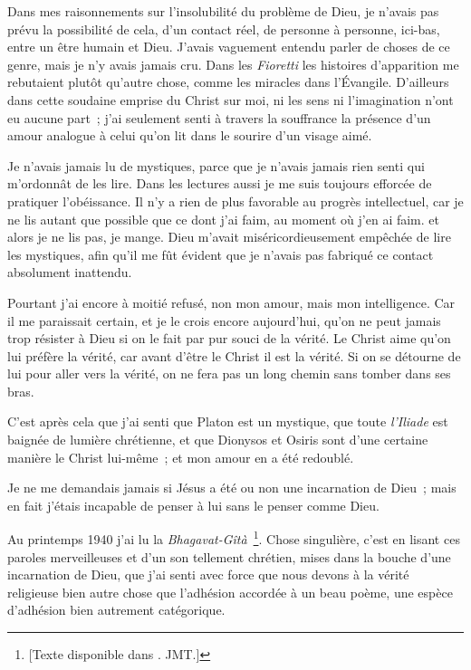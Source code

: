 \documentclass[french,twoside]{book} %
\begin{document}
Dans mes raisonnements sur l'insolubilité du problème de Dieu, je n'avais pas prévu la possibilité de cela, d'un contact réel, de personne à personne, ici-bas, entre un être humain et Dieu. J'avais vaguement entendu parler de choses de ce genre, mais je n'y avais jamais cru. Dans les {\itshape Fioretti} les histoires d'apparition me rebutaient plutôt qu'autre chose, comme les miracles dans l'Évangile. D'ailleurs dans cette soudaine emprise du Christ sur moi, ni les sens ni l'imagination n'ont eu aucune part ; j'ai seulement senti à travers la souffrance la présence d'un amour analogue à celui qu'on lit dans le sourire d'un visage aimé.\par
Je n'avais jamais lu de mystiques, parce que je n'avais jamais rien senti qui m'ordonnât de les lire. Dans les lectures aussi je me suis toujours efforcée de pratiquer l'obéissance. Il n'y a rien de plus favorable au progrès intellectuel, car je ne lis autant que possible que ce dont j'ai faim, au moment où j'en ai faim. et alors je ne lis pas, je mange. Dieu m'avait miséricordieusement empêchée de lire les mystiques, afin qu'il me fût évident que je n'avais pas fabriqué ce contact absolument inattendu.\par
Pourtant j'ai encore à moitié refusé, non mon amour, mais mon intelligence. Car il me paraissait certain, et je le crois encore aujourd'hui, qu'on ne peut jamais trop résister à Dieu si on le fait par pur souci de la vérité. Le Christ aime qu'on lui préfère la vérité, car avant d'être le Christ il est la vérité. Si on se détourne de lui pour aller vers la vérité, on ne fera pas un long chemin sans tomber dans ses bras.\par
C'est après cela que j'ai senti que Platon est un mystique, que toute {\itshape l'Iliade} est baignée de lumière chrétienne, et que Dionysos et Osiris sont d'une certaine manière le Christ lui-même ; et mon amour en a été redoublé.\par
Je ne me demandais jamais si Jésus a été ou non une incarnation de Dieu ; mais en fait j'étais incapable de penser à lui sans le penser comme Dieu.\par
Au printemps 1940 j'ai lu la {\itshape Bhagavat-Gîtà} \footnote{ [Texte disponible dans \href{http://dx.doi.org/doi:10.1522/24900867}{}. JMT.]}. Chose singulière, c'est en lisant ces paroles merveilleuses et d'un son tellement chrétien, mises dans la bouche d'une incarnation de Dieu, que j'ai senti avec force que nous devons à la vérité religieuse bien autre chose que l'adhésion accordée à un beau poème, une espèce d'adhésion bien autrement catégorique.\par
\end{document}
